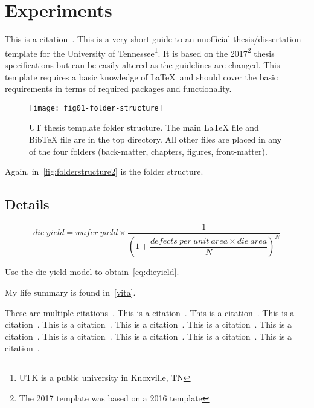 \chapter{Experiments} \label{chapter2}

This is a citation~\cite{utk:idr2016optimization}.
This is a very short guide to an unofficial thesis/dissertation template
for the University of Tennessee\footnote{UTK is a public university in Knoxville,
TN}.
It is based on the 2017\footnote{The 2017 template was based on a 2016 template} thesis specifications but can be easily altered
as the guidelines are changed.
This template requires a basic knowledge of \LaTeX\ and should cover
the basic requirements in terms of required packages and functionality.

\begin{figure}[!htb]
    \Centering
    \texttt{[image: fig01-folder-structure]}
    \caption[UT thesis template folder structure]{UT thesis template folder structure.
        The main LaTeX file and BibTeX file are in the top directory.
        All other files are placed in any of the four folders
        (back-matter, chapters, figures, front-matter).}
    \label{fig:folderstructure2}
\end{figure}

Again, in~\autoref{fig:folderstructure2} is the folder structure.

\section{Details} \label{details}

\begin{equation}
    die\ yield = wafer\ yield \times \dfrac{1}{\left(1 + \dfrac{defects\ per\ unit\ area \times die\ area}{N}\right)^N}
    \label{eq:dieyield}
\end{equation}

Use the die yield model to obtain~\autoref{eq:dieyield}.

My life summary is found in~\autoref{vita}.

These are multiple citations~\cite{utk:rdf2018jac,utk:hspwrap2015blast,pupr:plasma2014fpga,ornl:sensorfusion2012}.
This is a citation~\cite{ornl:dmrg2011}.
This is a citation~\cite{caaqa2017appsol}.
This is a citation~\cite{caaqa2017}.
This is a citation~\cite{ornl:poplar2014gateway}.
This is a citation~\cite{utk:hspwrap2014blast}.
This is a citation~\cite{ornl:async2012gpu}.
This is a citation~\cite{ornl:async2011gpu}.
This is a citation~\cite{ornl:dmrg2010}.
This is a citation~\cite{ornl:ipcc2009}.
This is a citation~\cite{utk:idr2015cohpc}.
This is a citation~\cite{pupr:chair2010icste}.
